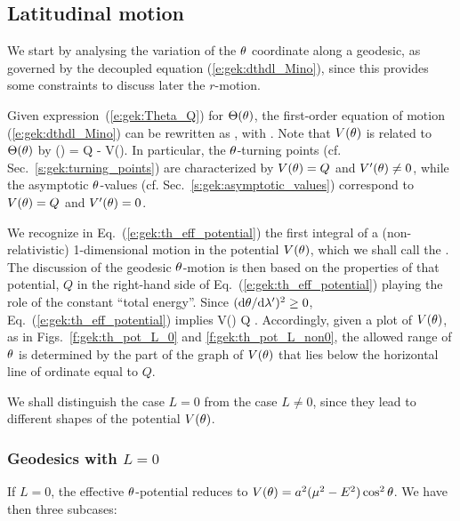 \subsection{Latitudinal motion} \label{s:gek:th_motion}

We start by analysing the variation of the $\theta$ coordinate along a geodesic,
as governed by the decoupled equation
(\ref{e:gek:dthdl_Mino}), since this provides some constraints
to discuss later the $r$-motion.

Given expression~(\ref{e:gek:Theta_Q}) for $\Theta(\theta)$,
the first-order equation of motion (\ref{e:gek:dthdl_Mino}) can be rewritten as
\be \label{e:gek:th_eff_potential}
    ,
\ee
with
\be \label{e:gek:def_V_th}
  .
\ee
Note that $V(\theta)$ is related to $\Theta(\theta)$ by
\be
    \Theta(\th) = Q - V(\th).
\ee
In particular, the $\theta$-turning points (cf. Sec.~\ref{s:gek:turning_points})
are characterized by
$V(\theta) = Q$ and $V'(\theta) \neq 0$, while the asymptotic $\theta$-values
(cf. Sec.~\ref{s:gek:asymptotic_values})
correspond to $V(\theta) = Q$ and $V'(\theta) = 0$.

We recognize in Eq.~(\ref{e:gek:th_eff_potential}) the first integral of a
(non-relativistic) 1-dimensional motion in the potential $V(\theta)$, which we
shall call the
.
The discussion of the geodesic $\theta$-motion
is then based on the properties of that potential, $Q$
in the right-hand side of Eq.~(\ref{e:gek:th_eff_potential})
playing the role of
the constant ``total energy''. Since $(\mathrm{d}\theta / \mathrm{d}\lambda')^2 \geq 0$,
Eq.~(\ref{e:gek:th_eff_potential})  implies
\be \label{e:gek:V_leq_Q}
    V(\th) \leq Q .
\ee
Accordingly, given a plot of $V(\theta)$, as in Figs.~\ref{f:gek:th_pot_L_0} and
\ref{f:gek:th_pot_L_non0}, the allowed range of $\theta$ is determined
by the part of the graph of $V(\theta)$ that lies below
the horizontal line of ordinate equal to $Q$.

We shall distinguish the
case $L=0$ from the case $L\not=0$, since they lead
to different shapes of the potential $V(\theta)$.



\subsubsection{Geodesics with $L=0$}

If $L=0$, the effective $\theta$-potential reduces to $V(\theta)=a^2(\mu^2 - E^2)\cos^2\theta$.
We have then three subcases:

